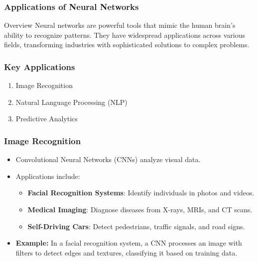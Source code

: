 \documentclass[aspectratio=169]{beamer}
\begin{document}
\begin{frame}[fragile]
    \frametitle{Applications of Neural Networks}
    \begin{block}{Overview}
        Neural networks are powerful tools that mimic the human brain’s ability to recognize patterns. They have widespread applications across various fields, transforming industries with sophisticated solutions to complex problems.
    \end{block}
\end{frame}

\begin{frame}[fragile]
    \frametitle{Key Applications}
    \begin{enumerate}
        \item Image Recognition
        \item Natural Language Processing (NLP)
        \item Predictive Analytics
    \end{enumerate}
\end{frame}

\begin{frame}[fragile]
    \frametitle{Image Recognition}
    \begin{itemize}
        \item Convolutional Neural Networks (CNNs) analyze visual data.
        \item Applications include:
        \begin{itemize}
            \item \textbf{Facial Recognition Systems}: Identify individuals in photos and videos.
            \item \textbf{Medical Imaging}: Diagnose diseases from X-rays, MRIs, and CT scans.
            \item \textbf{Self-Driving Cars}: Detect pedestrians, traffic signals, and road signs.
        \end{itemize}
        \item \textbf{Example:} In a facial recognition system, a CNN processes an image with filters to detect edges and textures, classifying it based on training data.
    \end{itemize}
\end{frame}
\end{document}
